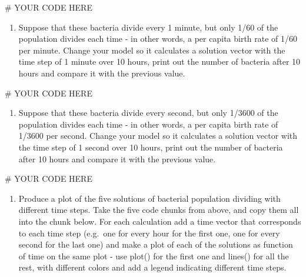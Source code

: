\documentclass[
  letterpaper,
  DIV=11,
  numbers=noendperiod]{scrreprt}
\newenvironment{Shaded}{\begin{snugshade}}{\end{snugshade}}
\newcommand{\CommentTok}[1]{\textcolor[rgb]{0.37,0.37,0.37}{#1}}
\providecommand{\tightlist}{%
  \setlength{\itemsep}{0pt}\setlength{\parskip}{0pt}}\usepackage{longtable,booktabs,array}
\begin{document}
\begin{Shaded}
\begin{Highlighting}[]
\CommentTok{\# YOUR CODE HERE}
\end{Highlighting}
\end{Shaded}

\begin{enumerate}
\def\labelenumi{\arabic{enumi}.}
\setcounter{enumi}{3}
\tightlist
\item
  Suppose that these bacteria divide every 1 minute, but only 1/60 of
  the population divides each time - in other words, a per capita birth
  rate of 1/60 per minute. Change your model so it calculates a solution
  vector with the time step of 1 minute over 10 hours, print out the
  number of bacteria after 10 hours and compare it with the previous
  value.
\end{enumerate}

\begin{Shaded}
\begin{Highlighting}[]
\CommentTok{\# YOUR CODE HERE}
\end{Highlighting}
\end{Shaded}

\begin{enumerate}
\def\labelenumi{\arabic{enumi}.}
\setcounter{enumi}{4}
\tightlist
\item
  Suppose that these bacteria divide every second, but only 1/3600 of
  the population divides each time - in other words, a per capita birth
  rate of 1/3600 per second. Change your model so it calculates a
  solution vector with the time step of 1 second over 10 hours, print
  out the number of bacteria after 10 hours and compare it with the
  previous value.
\end{enumerate}

\begin{Shaded}
\begin{Highlighting}[]
\CommentTok{\# YOUR CODE HERE}
\end{Highlighting}
\end{Shaded}

\begin{enumerate}
\def\labelenumi{\arabic{enumi}.}
\setcounter{enumi}{5}
\tightlist
\item
  Produce a plot of the five solutions of bacterial population dividing
  with different time steps. Take the five code chunks from above, and
  copy them all into the chunk below. For each calculation add a time
  vector that corresponds to each time step (e.g.~one for every hour for
  the first one, one for every second for the last one) and make a plot
  of each of the solutions as function of time on the same plot - use
  plot() for the first one and lines() for all the rest, with different
  colors and add a legend indicating different time steps.
\end{enumerate}
\end{document}
